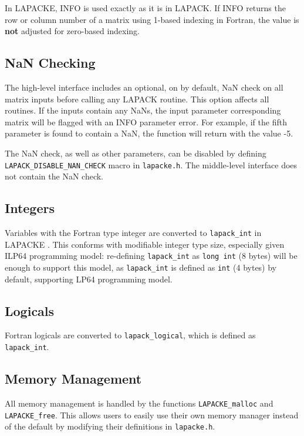 In LAPACKE, INFO is used exactly as it is in LAPACK. If INFO returns the row or column number of a matrix using 1-based indexing in Fortran, the value is {\bf not} adjusted for zero-based indexing.

\subsection{NaN Checking}

The high-level interface includes an optional, on by default, NaN check on all matrix inputs before calling any LAPACK routine. 
This option affects all routines. If the inputs contain any NaNs, the input parameter corresponding matrix will be flagged with an INFO parameter error. For example, if the fifth parameter is found to contain a NaN, the function will return with the value -5.

The NaN check, as well as other parameters, can be disabled by defining {\tt LAPACK\_DISABLE\_NAN\_CHECK} macro in {\tt lapacke.h}. The middle-level interface does not contain the NaN check.

\subsection{Integers}

Variables with the Fortran type integer are converted to {\tt lapack\_int} in LAPACKE
. This conforms with modifiable integer type size, especially given ILP64 programming model: re-defining {\tt lapack\_int} as {\tt long int} (8 bytes) will be enough to support this model, as {\tt lapack\_int} 
is defined as {\tt int} (4 bytes) by default, supporting LP64 programming model.

\subsection{Logicals}

Fortran logicals are converted to {\tt lapack\_logical}, which is defined as {\tt lapack\_int}.

\subsection{Memory Management}

All memory management is handled by the functions {\tt LAPACKE\_malloc} and {\tt LAPACKE\_free}. This allows users to easily use their own memory manager instead of the default by modifying their definitions in {\tt lapacke.h}.


